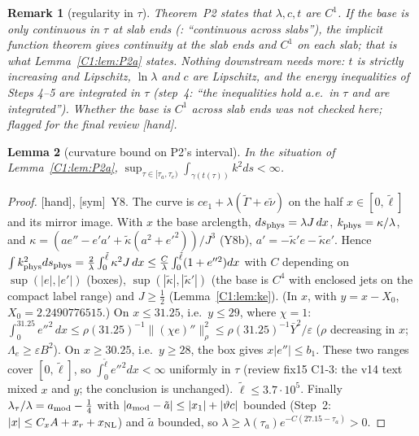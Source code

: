 \documentclass[11pt]{article}
\newtheorem{lemma}{Lemma}[section]\newtheorem{proposition}[lemma]{Proposition}\newtheorem{theorem}[lemma]{Theorem}\newtheorem{remark}[lemma]{Remark}
\newcommand{\fn}[1]{\texttt{\detokenize{#1}}}
\newcommand{\tH}{\textup{[hand]}}\newcommand{\tS}{\textup{[sym]}}\newcommand{\tC}{\textup{[cert]}}\newcommand{\tI}{\textup{[cited]}}\newcommand{\tN}{\textup{[num]}}
\begin{document}
\begin{remark}[regularity in $\tau$]\label{C1:rem:C1}
Theorem~P2 states that $\lambda,c,t$ are $C^1$. If the base is only continuous in $\tau$ at slab ends (\fn{step4_proof.tex}: ``continuous across slabs''), the implicit function theorem gives continuity at the slab ends and $C^1$ on each slab; that is what Lemma~\ref{C1:lem:P2a} states. Nothing downstream needs more: $t$ is strictly increasing and Lipschitz, $\ln\lambda$ and $c$ are Lipschitz, and the energy inequalities of Steps 4--5 are integrated in $\tau$ (step~4: ``the inequalities hold a.e.\ in $\tau$ and are integrated''). Whether the base is $C^1$ across slab ends was not checked here; flagged for the final review \tH.
\end{remark}

\begin{lemma}[curvature bound on P2's interval]\label{C1:lem:kP2}
In the situation of Lemma~\ref{C1:lem:P2a}, $\sup_{\tau\in[\tau_a,\tau_e)}\int_{\gamma(t(\tau))}k^2ds<\infty$.
\end{lemma}
\begin{proof}\tH, \tS\ Y8. The curve is $ce_1+\lambda(\tilde\Gamma+e\tilde\nu)$ on the half $x\in[0,\tilde\ell]$ and its mirror image. With $x$ the base arclength, $ds_{\rm phys}=\lambda J\,dx$, $k_{\rm phys}=\kappa/\lambda$, and $\kappa=(ae''-e'a'+\tilde\kappa(a^2+e'^2))/J^3$ (Y8b), $a'=-\tilde\kappa'e-\tilde\kappa e'$. Hence $\int k^2_{\rm phys}ds_{\rm phys}=\frac2\lambda\int_0^{\tilde\ell}\kappa^2J\,dx\le\frac{C}{\lambda}\int_0^{\tilde\ell}(1+e''^2)dx$ with $C$ depending on $\sup(|e|,|e'|)$ (boxes), $\sup(|\tilde\kappa|,|\tilde\kappa'|)$ (the base is $C^4$ with enclosed jets on the compact label range) and $J\ge\frac12$ (Lemma~\ref{C1:lem:ke}). (In $x$, with $y=x-X_0$, $X_0=2.2490776515$.) On $x\le31.25$, i.e.\ $y\le29$, where $\chi=1$: $\int_0^{31.25}e''^2\,dx\le\rho(31.25)^{-1}\|(\chi e)''\|_\rho^2\le\rho(31.25)^{-1}\bar Y^2/\varepsilon$ ($\rho$ decreasing in $x$; $\Lambda_e\ge\varepsilon B^2$). On $x\ge30.25$, i.e.\ $y\ge28$, the box gives $x|e''|\le b_1$. These two ranges cover $[0,\tilde\ell]$, so $\int_0^{\tilde\ell}e''^2dx<\infty$ uniformly in $\tau$ (review fix15 C1-3: the v14 text mixed $x$ and $y$; the conclusion is unchanged). $\tilde\ell\le3.7\cdot10^5$. Finally $\lambda_\tau/\lambda=a_{\rm mod}-\frac14$ with $|a_{\rm mod}-\tilde a|\le|x_1|+|\vartheta c|$ bounded (Step~2: $|x|\le C_xA+x_r+x_{\rm NL}$) and $\tilde a$ bounded, so $\lambda\ge\lambda(\tau_a)e^{-C(27.15-\tau_a)}>0$.
\end{proof}
\end{document}
